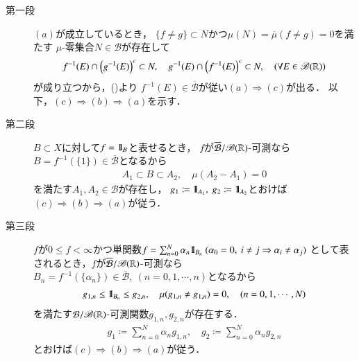 		\begin{prf}\mbox{}
			\begin{description}
				\item[第一段]
					$(a)$が成立しているとき，
					$\{f \neq g\} \subset N$かつ$\mu(N) = \overline{\mu}(f \neq g) = 0$を満たす
					$\mu$-零集合$N \in \mathcal{B}$が存在して
					\begin{align}
						f^{-1}(E) \cap \left( g^{-1}(E) \right)^c \subset N,
						\quad g^{-1}(E) \cap \left( f^{-1}(E) \right)^c \subset N,
						\quad (\forall E \in \mathscr{B}(\mathbb{R}))
					\end{align}
					が成り立つから，()より
					$f^{-1}(E) \in \overline{\mathcal{B}}$が従い$(a) \Rightarrow (c)$が出る．
					以下，$(c) \Rightarrow (b) \Rightarrow (a)$を示す．
					
				\item[第二段]
					$B \subset X$に対して$f = \mbox{1}\hspace{-0.25em}\mbox{l}_B$と表せるとき，
					$f$が$\overline{\mathcal{B}}/\mathscr{B}(\mathbb{R})$-可測なら
					$B = f^{-1}(\{1\}) \in \overline{\mathcal{B}}$となるから
					\begin{align}
						A_1 \subset B \subset A_2,\quad \mu(A_2 - A_1)=0
					\end{align}
					を満たす$A_1,A_2 \in \mathcal{B}$が存在し，
					$g_1 \coloneqq \mbox{1}\hspace{-0.25em}\mbox{l}_{A_1},\ g_2 \coloneqq \mbox{1}\hspace{-0.25em}\mbox{l}_{A_2}$とおけば
					$(c) \Rightarrow (b) \Rightarrow (a)$が従う．
				
				\item[第三段]
					$f$が$0 \leq f < \infty$かつ単関数$f = \sum_{n=0}^N \alpha_n \defunc_{B_n}\ 
					(\alpha_0 = 0,\ i \neq j \Rightarrow \alpha_i \neq \alpha_j)$
					として表されるとき，$f$が$\overline{\mathcal{B}}/\mathscr{B}(\mathbb{R})$-可測なら
					$B_n = f^{-1}(\{\alpha_n\}) \in \overline{\mathcal{B}},\ (n=0,1,\cdots,n)$となるから
					\begin{align}
						g_{1,n} \leq \mbox{1}\hspace{-0.25em}\mbox{l}_{B_n} \leq g_{2,n},
						\quad \mu(g_{1,n} \neq g_{1,n})=0,
						\quad (n=0,1,\cdots,N)
					\end{align}
					を満たす$\mathcal{B}/\mathscr{B}(\mathbb{R})$-可測関数$g_{1,n},g_{2,n}$が存在する．
					\begin{align}
						g_1 \coloneqq \sum_{n=0}^N \alpha_n g_{1,n},
						\quad g_2 \coloneqq \sum_{n=0}^N \alpha_n g_{2,n}
					\end{align}
					とおけば$(c) \Rightarrow (b) \Rightarrow (a)$が従う．
					

\end{description}
\end{prf}
